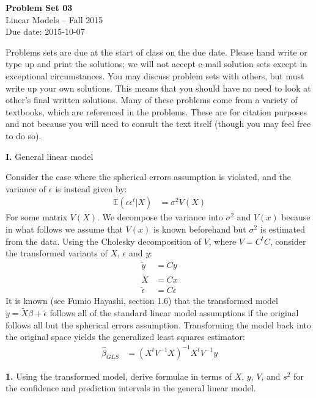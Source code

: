\documentclass[12pt]{article}
\begin{document}
\begin{center}
{\bf Problem Set 03} \\
Linear Models -- Fall 2015 \\
Due date: 2015-10-07
\end{center}

\medskip

Problems sets are due at the start of class on the due date. Please hand write
or type up and print the solutions; we will not accept e-mail solution sets except
in exceptional circumstances. You may discuss problem sets with others, but must
write up your own solutions. This means that you should have no need to look at other's
final written solutions. Many of these problems come from a variety of textbooks,
which are referenced in the problems. These are for citation purposes and not because
you will need to consult the text itself (though you may feel free to do so).

\medskip

{\bf I.} General linear model

Consider the case where the spherical errors assumption is violated, and
the variance of $\epsilon$ is instead given by:
\begin{align}
\mathbb{E} (\epsilon \epsilon^t | X) &= \sigma^2 V(X) \label{gerr}
\end{align}
For some matrix $V(X)$. We decompose the variance into $\sigma^2$ and $V(x)$ because
in what follows we assume that $V(x)$ is known beforehand but $\sigma^2$ is estimated
from the data. Using the Cholesky decomposition of $V$, where $V = C^t C$, consider
the transformed variants of $X$, $\epsilon$ and $y$:
\begin{align}
\tilde{y} &= Cy \\
\tilde{X} &= Cx \\
\tilde{\epsilon} &= C\epsilon
\end{align}
It is known (see Fumio Hayashi, section 1.6) that the transformed model
$\tilde{y} = \tilde{X}\beta + \tilde{\epsilon}$ follows all of the standard
linear model assumptions if the original follows all but the spherical errors
assumption. Transforming the model back into the original space yields the
generalized least squares estimator:
\begin{align}
\widehat{\beta}_{GLS} &= (X^t V^{-1} X)^{-1} X^t V^{-1} y
\end{align}

{\bf 1.} Using the transformed model, derive formulae in terms of $X$, $y$, $V$, and
$s^2$ for the confidence and prediction intervals in the general linear model.
\end{document}

